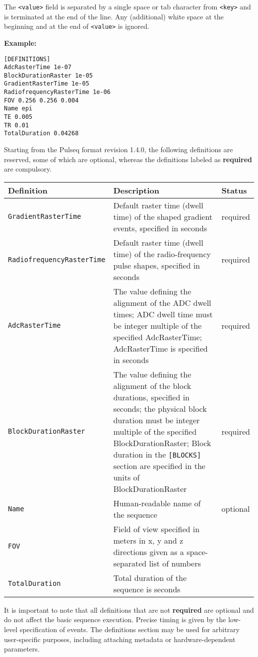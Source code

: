 \documentclass{article}
\begin{document}
The \verb.<value>. field is separated by a single space or tab character from \verb.<key>. and is terminated at the end of the line. Any (additional) white space at the beginning and at the end of \verb.<value>. is ignored.

\textbf{Example:}
\begin{lstlisting}
[DEFINITIONS]
AdcRasterTime 1e-07 
BlockDurationRaster 1e-05 
GradientRasterTime 1e-05 
RadiofrequencyRasterTime 1e-06 
FOV 0.256 0.256 0.004 
Name epi 
TE 0.005
TR 0.01
TotalDuration 0.04268 
\end{lstlisting}

Starting from the Pulseq format revision 1.4.0, the following definitions are reserved, some of which are optional, whereas the definitions labeled as \textbf{required} are compulsory.

\begin{tabularx}{\textwidth}{lXl}
\toprule
Definition & Description & Status\\
\midrule
\verb.GradientRasterTime. & Default raster time (dwell time) of the shaped gradient events, specified in seconds & required \\
\verb.RadiofrequencyRasterTime. & Default raster time (dwell time) of the radio-frequency pulse shapes, specified in seconds & required \\
\verb.AdcRasterTime. & The value defining the alignment of the ADC dwell times; ADC dwell time must be integer multiple of the specified AdcRasterTime; AdcRasterTime is specified in seconds & required \\
\verb.BlockDurationRaster. & The value defining the alignment of the block durations, specified in seconds; the physical block duration must be integer multiple of the specified BlockDurationRaster; Block duration in the \verb.[BLOCKS]. section are specified in the units of BlockDurationRaster  & required\\
\verb.Name. & Human-readable name of the sequence & optional \\
\verb.FOV. & Field of view specified in meters in x, y and z directions given as a space-separated list of numbers \\
\verb.TotalDuration. & Total duration of the sequence is seconds \\
\bottomrule
\end{tabularx}

It is important to note that all definitions that are not  \textbf{required} are optional and do not affect the basic sequence execution. Precise timing is given by the low-level specification of events. The definitions section may be used for arbitrary user-specific purposes, including attaching metadata or hardware-dependent parameters.
\end{document}
